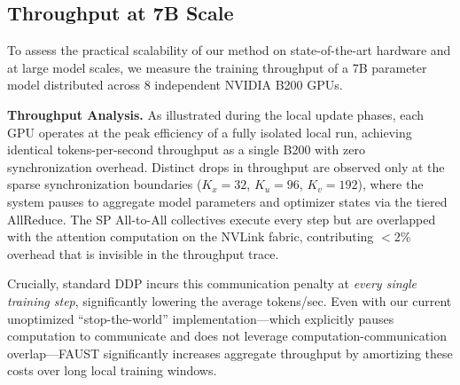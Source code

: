 \documentclass{article}
\begin{document}
\subsection{Throughput at 7B Scale}
\label{sec:b9_throughput}

To assess the practical scalability of our method on state-of-the-art hardware and at large model scales, we measure the training throughput of a 7B parameter model distributed across $8$ independent NVIDIA B200 GPUs.

\textbf{Throughput Analysis.} As illustrated during the local update phases, each GPU operates at the peak efficiency of a fully isolated local run, achieving identical tokens-per-second throughput as a single B200 with zero synchronization overhead. Distinct drops in throughput are observed only at the sparse synchronization boundaries ($K_x=32$, $K_u=96$, $K_v=192$), where the system pauses to aggregate model parameters and optimizer states via the tiered AllReduce. The SP All-to-All collectives execute every step but are overlapped with the attention computation on the NVLink fabric, contributing $<2\%$ overhead that is invisible in the throughput trace.


Crucially, standard DDP incurs this communication penalty at \textit{every single training step}, significantly lowering the average tokens/sec. Even with our current unoptimized ``stop-the-world'' implementation---which explicitly pauses computation to communicate and does not leverage computation-communication overlap---FAUST significantly increases aggregate throughput by amortizing these costs over long local training windows.

\begin{center}\end{center}

\end{document}
